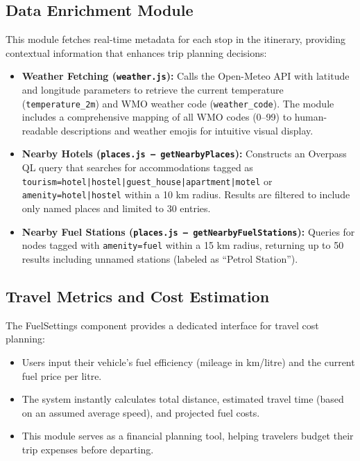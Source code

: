 \subsection{Data Enrichment Module}
This module fetches real-time metadata for each stop in the itinerary, providing contextual information that enhances trip planning decisions:
\begin{itemize}
    \item \textbf{Weather Fetching (\texttt{weather.js}):} Calls the Open-Meteo API with latitude and longitude parameters to retrieve the current temperature (\texttt{temperature\_2m}) and WMO weather code (\texttt{weather\_code}). The module includes a comprehensive mapping of all WMO codes (0--99) to human-readable descriptions and weather emojis for intuitive visual display.
    \item \textbf{Nearby Hotels (\texttt{places.js --- getNearbyPlaces}):} Constructs an Overpass QL query that searches for accommodations tagged as \texttt{tourism=hotel|hostel|guest\_house|apartment|motel} or \texttt{amenity=hotel|hostel} within a 10 km radius. Results are filtered to include only named places and limited to 30 entries.
    \item \textbf{Nearby Fuel Stations (\texttt{places.js --- getNearbyFuelStations}):} Queries for nodes tagged with \texttt{amenity=fuel} within a 15 km radius, returning up to 50 results including unnamed stations (labeled as ``Petrol Station'').
\end{itemize}

\subsection{Travel Metrics and Cost Estimation}
The FuelSettings component provides a dedicated interface for travel cost planning:
\begin{itemize}
    \item Users input their vehicle's fuel efficiency (mileage in km/litre) and the current fuel price per litre.
    \item The system instantly calculates total distance, estimated travel time (based on an assumed average speed), and projected fuel costs.
    \item This module serves as a financial planning tool, helping travelers budget their trip expenses before departing.
\end{itemize}

